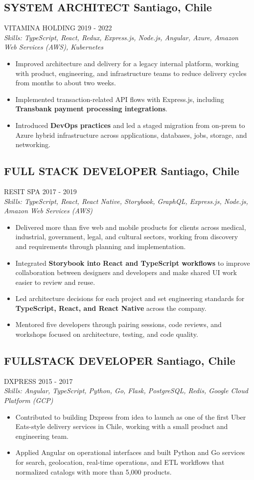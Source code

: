 \documentclass{article}
\newcommand{\WorkExperience}[2]{
   \subsection*{#1}
   \vspace{-1em}
   \uppercase{#2}
}
\newcommand{\Skills}[1]{
   \textit{Skills: #1}
}
\begin{document}
\WorkExperience{SYSTEM ARCHITECT \hfill Santiago, Chile}{Vitamina Holding \hfill 2019 {-} 2022} \\
\Skills{TypeScript, React, Redux, Express.js, Node.js, Angular, Azure, Amazon Web Services (AWS), Kubernetes}
\begin{itemize}
	\item Improved architecture and delivery for a legacy internal platform, working with product, engineering, and infrastructure teams to reduce delivery cycles from months to about two weeks.
	\item Implemented transaction-related API flows with Express.js, including \textbf{Transbank payment processing integrations}.
	\item Introduced \textbf{DevOps practices} and led a staged migration from on-prem to Azure hybrid infrastructure across applications, databases, jobs, storage, and networking.
\end{itemize}

\WorkExperience{FULL STACK DEVELOPER \hfill Santiago, Chile}{Resit SPA \hfill 2017 {-} 2019} \\
\Skills{TypeScript, React, React Native, Storybook, GraphQL, Express.js, Node.js, Amazon Web Services (AWS)}
\begin{itemize}
	\item Delivered more than five web and mobile products for clients across medical, industrial, government, legal, and cultural sectors, working from discovery and requirements through planning and implementation.
	\item Integrated \textbf{Storybook into React and TypeScript workflows} to improve collaboration between designers and developers and make shared UI work easier to review and reuse.
	\item Led architecture decisions for each project and set engineering standards for \textbf{TypeScript, React, and React Native} across the company.
	\item Mentored five developers through pairing sessions, code reviews, and workshops focused on architecture, testing, and code quality.
\end{itemize}

\WorkExperience{FULLSTACK DEVELOPER \hfill Santiago, Chile}{Dxpress \hfill 2015 {-} 2017} \\
\Skills{Angular, TypeScript, Python, Go, Flask, PostgreSQL, Redis, Google Cloud Platform (GCP)}
\begin{itemize}
	\item Contributed to building Dxpress from idea to launch as one of the first Uber Eats-style delivery services in Chile, working with a small product and engineering team.
	\item Applied Angular on operational interfaces and built Python and Go services for search, geolocation, real-time operations, and ETL workflows that normalized catalogs with more than 5,000 products.
\end{itemize}
\end{document}
